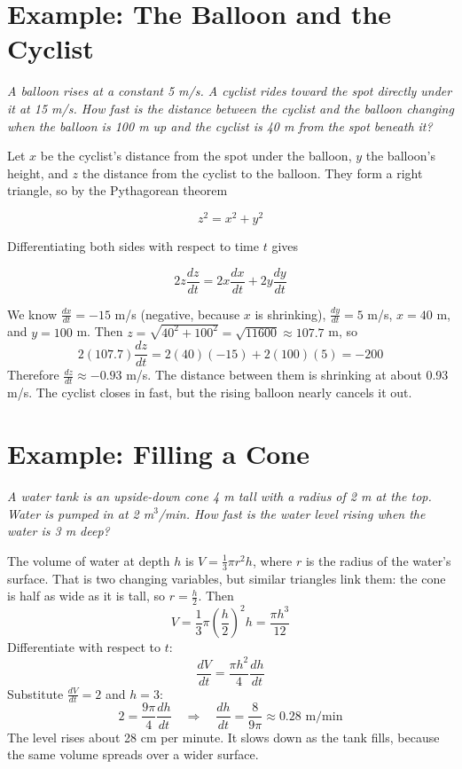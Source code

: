 \section{Example: The Balloon and the Cyclist}

\textit{A balloon rises at a constant 5 m/s. A cyclist rides toward the
spot directly under it at 15 m/s. How fast is the distance between the
cyclist and the balloon changing when the balloon is 100 m up and the
cyclist is 40 m from the spot beneath it?}

Let $x$ be the cyclist's distance from the spot under the balloon, $y$
the balloon's height, and $z$ the distance from the cyclist to the
balloon. They form a right triangle, so by the Pythagorean theorem

\begin{equation}
z^2 = x^2 + y^2
\end{equation}

Differentiating both sides with respect to time $t$ gives

\begin{equation}
2z \frac{dz}{dt} = 2x \frac{dx}{dt} + 2y \frac{dy}{dt}
\end{equation}

We know $\frac{dx}{dt} = -15$ m/s (negative, because $x$ is shrinking),
$\frac{dy}{dt} = 5$ m/s, $x = 40$ m, and $y = 100$ m. Then $z =
\sqrt{40^2 + 100^2} = \sqrt{11600} \approx 107.7$ m, so
$$2(107.7)\frac{dz}{dt} = 2(40)(-15) + 2(100)(5) = -200$$
Therefore $\frac{dz}{dt} \approx -0.93$ m/s. The distance between them is
shrinking at about 0.93 m/s. The cyclist closes in fast, but the rising
balloon nearly cancels it out.

\section{Example: Filling a Cone}

\textit{A water tank is an upside-down cone 4 m tall with a radius of 2 m
at the top. Water is pumped in at 2 m$^3$/min. How fast is the water
level rising when the water is 3 m deep?}

The volume of water at depth $h$ is $V = \frac{1}{3}\pi r^2 h$, where $r$
is the radius of the water's surface. That is two changing variables, but
similar triangles link them: the cone is half as wide as it is tall, so
$r = \frac{h}{2}$. Then
$$V = \frac{1}{3}\pi \left(\frac{h}{2}\right)^2 h = \frac{\pi h^3}{12}$$
Differentiate with respect to $t$:
$$\frac{dV}{dt} = \frac{\pi h^2}{4}\frac{dh}{dt}$$
Substitute $\frac{dV}{dt} = 2$ and $h = 3$:
$$2 = \frac{9\pi}{4}\frac{dh}{dt} \quad\Rightarrow\quad \frac{dh}{dt} = \frac{8}{9\pi} \approx 0.28 \text{ m/min}$$
The level rises about 28 cm per minute. It slows down as the tank fills,
because the same volume spreads over a wider surface.

